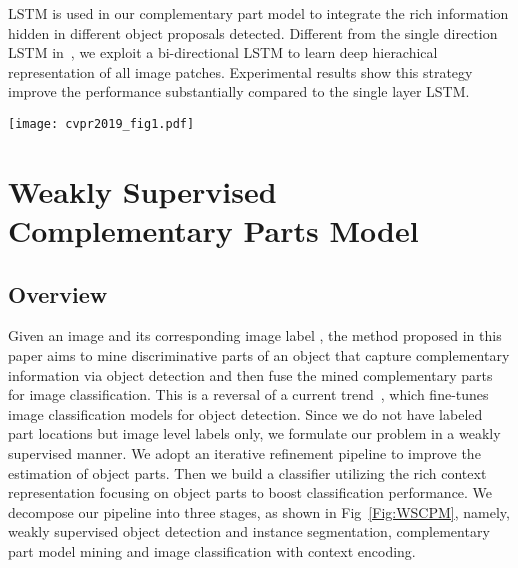 \documentclass[10pt,twocolumn,letterpaper]{article}
\begin{document}
LSTM is used in our complementary part model to integrate the rich information hidden in different object proposals detected. Different from the single direction LSTM in~\cite{lam2017fine,wang2017multi}, we exploit a bi-directional LSTM to learn deep hierachical representation of all image patches. Experimental results show this strategy improve the performance substantially compared to the single layer LSTM.

\begin{figure*}[ht]
  \centering
  \texttt{[image: cvpr2019\_fig1.pdf]}
  \caption{The proposed image classification pipeline based on weakly supervised complementary parts model. From top to bottom: (a) Weakly Supervised Object Detection and Instance Segmentation: The first step initializes the segmentation probability map by CAM~\cite{zhou2016learning}, and obtaining coarse instance segmentation maps by CRF~\cite{sutton2012introduction}. Then the segments and bounding boxes are used as groundtruth annotations for training Mask R-CNN~\cite{he2017mask} in an iterative manner. (b) Complementary Parts Model: Search for complementary object proposals to form the object parts model. (c) Image Classification with Context Encoding: Two LSTMs~\cite{hochreiter1997long} are stacked together to fuse and encode the partial information provided by different object parts.}
  \label{Fig:WSCPM}
\end{figure*}


\section{Weakly Supervised Complementary Parts Model}

\subsection{Overview}
Given an image  and its corresponding image label , the method proposed in this paper aims to mine discriminative parts  of an object that capture complementary information via object detection and then fuse the mined complementary parts for image classification. This is a reversal of a current trend~\cite{he2017mask, ren2015faster, lin2017feature}, which fine-tunes image classification models for object detection. Since we do not have labeled part locations but image level labels only, we formulate our problem in a weakly supervised manner. We adopt an iterative refinement pipeline to improve the estimation of object parts. Then we build a classifier utilizing the rich context representation focusing on object parts to boost classification performance. We decompose our pipeline into three stages, as shown in Fig~\ref{Fig:WSCPM}, namely, weakly supervised object detection and instance segmentation, complementary part model mining and image classification with context encoding.
\end{document}
